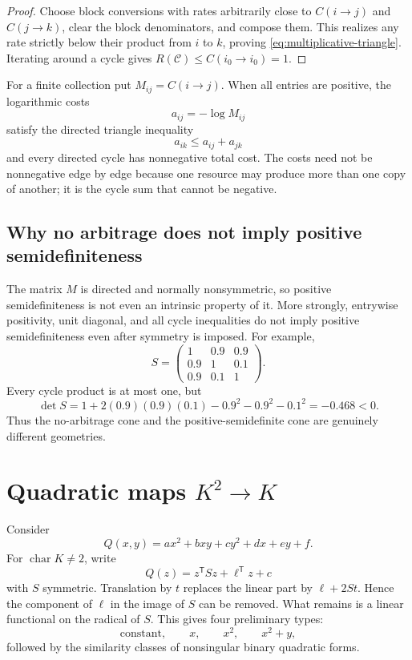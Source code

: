 \documentclass[11pt]{article}
\theoremstyle{definition}
\theoremstyle{plain}
\theoremstyle{remark}
\begin{document}
\begin{proof}
Choose block conversions with rates arbitrarily close to
\(C(i\to j)\) and \(C(j\to k)\), clear the block denominators, and compose
them.  This realizes any rate strictly below their product from \(i\) to
\(k\), proving \eqref{eq:multiplicative-triangle}.  Iterating around a cycle
gives \(R(\mathcal C)\le C(i_0\to i_0)=1\).
\end{proof}

For a finite collection put \(M_{ij}=C(i\to j)\).  When all entries are
positive, the logarithmic costs
\begin{equation}
  a_{ij}=-\log M_{ij}
  \label{eq:log-cost}
\end{equation}
satisfy the directed triangle inequality
\[
  a_{ik}\le a_{ij}+a_{jk}
\]
and every directed cycle has nonnegative total cost.  The costs need not be
nonnegative edge by edge because one resource may produce more than one copy
of another; it is the cycle sum that cannot be negative.

\subsection{Why no arbitrage does not imply positive semidefiniteness}

The matrix \(M\) is directed and normally nonsymmetric, so positive
semidefiniteness is not even an intrinsic property of it.  More strongly,
entrywise positivity, unit diagonal, and all cycle inequalities do not imply
positive semidefiniteness even after symmetry is imposed.  For example,
\[
  S=
  \begin{pmatrix}
    1&0.9&0.9\\
    0.9&1&0.1\\
    0.9&0.1&1
  \end{pmatrix}.
\]
Every cycle product is at most one, but
\[
  \det S
  =1+2(0.9)(0.9)(0.1)-0.9^2-0.9^2-0.1^2
  =-0.468<0.
\]
Thus the no-arbitrage cone and the positive-semidefinite cone are genuinely
different geometries.

\section{Quadratic maps \texorpdfstring{\(K^2\to K\)}{K2 to K}}
\label{sec:quadratic-normal-forms}

Consider
\begin{equation}
  Q(x,y)=ax^2+bxy+cy^2+dx+ey+f.
  \label{eq:binary-quadratic}
\end{equation}
For \(\operatorname{char}K\ne2\), write
\[
  Q(z)=z^{\mathsf T}Sz+\ell^{\mathsf T}z+c
\]
with \(S\) symmetric.  Translation by \(t\) replaces the linear part by
\(\ell+2St\).  Hence the component of \(\ell\) in the image of \(S\) can be
removed.  What remains is a linear functional on the radical of \(S\).
This gives four preliminary types:
\[
  \text{constant},\qquad
  x,\qquad
  x^2,\qquad
  x^2+y,
\]
followed by the similarity classes of nonsingular binary quadratic forms.
\end{document}

